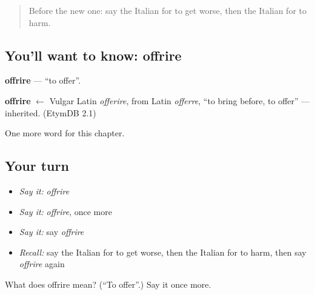 \begin{quote}
Before the new one: say the Italian for to get worse, then the Italian for to harm.
\end{quote}

\subsection*{You'll want to know: offrire}
\textbf{offrire} — \textquotedblleft{}to offer\textquotedblright{}.

\begin{cousinweb}
\textbf{offrire} $\leftarrow$ Vulgar Latin \emph{offerire}, from Latin \emph{offerre}, \textquotedblleft{}to bring before, to offer\textquotedblright{} — inherited. (EtymDB 2.1)
\end{cousinweb}

\begin{grammarlens}[title={What you've built}]
One more word for this chapter.
\end{grammarlens}

\subsection*{Your turn}
\begin{itemize}
\raggedright
  \item \emph{Say it:} \emph{offrire}
  \item \emph{Say it:} \emph{offrire}, once more
  \item \emph{Say it:} say \emph{offrire}
  \item \emph{Recall:} say the Italian for to get worse, then the Italian for to harm, then say \emph{offrire} again
\end{itemize}

\begin{tcolorbox}[breakable,colback=teal!4,colframe=teal!35!black,title={Before you move on}]
What does offrire mean? (\textquotedblleft{}To offer\textquotedblright{}.) Say it once more.
\end{tcolorbox}
